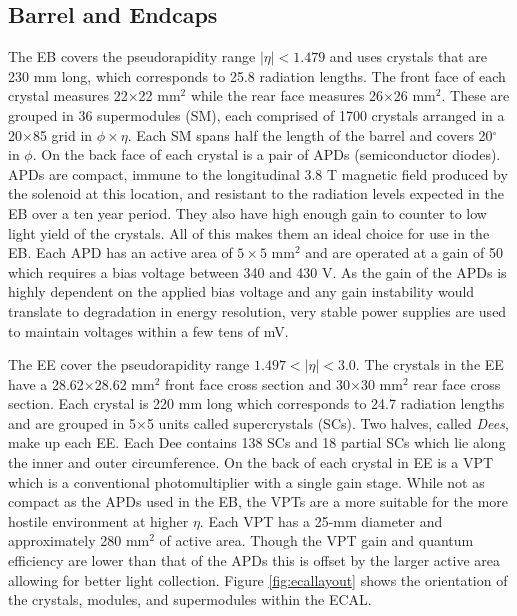 \subsection{Barrel and Endcaps}
The EB covers the pseudorapidity range $|\eta|<1.479$ and uses crystals that are 230 mm long, which corresponds to 25.8 radiation lengths.  The front face of each crystal measures 22$\times$22 mm$^{2}$ while the rear face measures 26$\times$26 mm$^{2}$.  These are grouped in 36 supermodules (SM), each comprised of 1700 crystals arranged in a 20$\times$85 grid in $\phi \times \eta$.  Each SM spans half the length of the barrel and covers 20$^{\circ}$ in $\phi$.  On the back face of each crystal is a pair of APDs (semiconductor diodes).  APDs are compact, immune to the longitudinal 3.8 T magnetic field produced by the solenoid at this location, and resistant to the radiation levels expected in the EB over a ten year period.  They also have high enough gain to counter to low light yield of the crystals.  All of this makes them an ideal choice for use in the EB.  Each APD has an active area of $5 \times 5$ mm$^{2}$ and are operated at a gain of 50 which requires a bias voltage between 340 and 430 V.  As the gain of the APDs is highly dependent on the applied bias voltage and any gain instability would translate to degradation in energy resolution, very stable power supplies are used to maintain voltages within a few tens of mV.

The EE cover the pseudorapidity range $1.497<|\eta|<3.0$.  The crystals in the EE have a 28.62$\times$28.62 mm$^{2}$ front face cross section and 30$\times$30 mm$^{2}$ rear face cross section.  Each crystal is 220 mm long which corresponds to 24.7 radiation lengths and are grouped in 5$\times$5 units called supercrystals (SCs).  Two halves, called \textit{Dees}, make up each EE.  Each Dee contains 138 SCs and 18 partial SCs which lie along the inner and outer circumference.  On the back of each crystal in EE is a VPT which is a conventional photomultiplier with a single gain stage. While not as compact as the APDs used in the EB, the VPTs are a more suitable for the more hostile environment at higher $\eta$.  Each VPT has a 25-mm diameter and approximately 280 mm$^{2}$ of active area.  Though the VPT gain and quantum efficiency are lower than that of the APDs this is offset by the larger active area allowing for better light collection.  Figure \ref{fig:ecallayout} shows the orientation of the crystals, modules, and supermodules within the ECAL.   \cite{Collaboration_2008}


